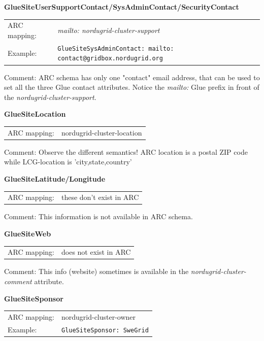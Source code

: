\documentclass{article}
\begin{document}
\hspace*{0.5cm}
\begin{shaded}
 \textbf{GlueSiteUserSupportContact/SysAdminContact/SecurityContact} 
\end{shaded}
\begin{tabular}{lp{10cm}}  
  ARC mapping:& {\it mailto: nordugrid-cluster-support}\\
  Example:& \verb#GlueSiteSysAdminContact: mailto: contact@gridbox.nordugrid.org#\\
\end{tabular}

Comment: ARC schema has only one "contact" email address, that can be used 
to set all the three Glue contact attributes. Notice the {\it mailto:}
Glue prefix in front of the {\it nordugrid-cluster-support}.


\hspace*{0.5cm}
\begin{shaded}
 \textbf{GlueSiteLocation} 
\end{shaded}
\begin{tabular}{lp{10cm}}  
  ARC mapping:& nordugrid-cluster-location\\  
\end{tabular}

Comment: Observe the different semantics! ARC location is a postal ZIP code while 
LCG-location is 'city,state,country'


\hspace*{0.5cm}
\begin{shaded}
 \textbf{GlueSiteLatitude/Longitude} 
\end{shaded}
\begin{tabular}{lp{10cm}}  
  ARC mapping:& these don't exist in ARC\\  
\end{tabular}

Comment: This information is not available in ARC schema.


\hspace*{0.5cm}
\begin{shaded}
 \textbf{GlueSiteWeb} 
\end{shaded}
\begin{tabular}{lp{10cm}}  
  ARC mapping:& does not exist in ARC\\ 
\end{tabular}

Comment: This info (website) sometimes is available in the 
{\it nordugrid-cluster-comment} attribute.


\hspace*{0.5cm}
\begin{shaded}
 \textbf{GlueSiteSponsor} 
\end{shaded}
\begin{tabular}{lp{10cm}}  
  ARC mapping:& nordugrid-cluster-owner\\
  Example:& \verb#GlueSiteSponsor: SweGrid#\\
\end{tabular}
\end{document}
